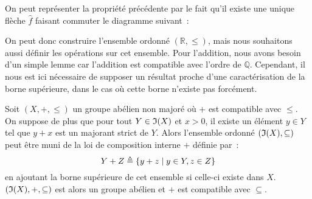 \begin{remark}
  On peut représenter la propriété précédente par le fait qu'il existe une
  unique flèche $\hat f$ faisant commuter le diagramme suivant~:
  \begin{center}
  \end{center}
\end{remark}

On peut donc construire l'ensemble ordonné $(\mathbb R,\leq)$, mais nous
souhaitons aussi définir les opérations sur cet ensemble. Pour l'addition, nous
avons besoin d'un simple lemme car l'addition est compatible avec l'ordre de
$\mathbb Q$. Cependant, il nous est ici nécessaire de supposer un résultat
proche d'une caractérisation de la borne supérieure, dans le cas où cette borne
n'existe pas forcément.

\begin{lemma}\label{lem.R.compat}
  Soit $(X,+,\leq)$ un groupe abélien non majoré où $+$ est compatible avec
  $\leq$. On suppose de plus que pour tout $Y \in \mathfrak{I}(X)$ et $x > 0$, il
  existe un élément $y \in Y$ tel que $y + x$ est un majorant strict de $Y$.
  Alors l'ensemble ordonné $(\mathfrak{I}(X),\subseteq)$ peut être muni de la loi de
  composition interne $+$ définie par~:
  \[Y + Z \triangleq \{y + z \mid y \in Y, z \in Z\}\]
  en ajoutant la borne supérieure de cet ensemble si celle-ci existe dans $X$.
  $(\mathfrak{I}(X),+,\subseteq)$ est alors un groupe abélien et $+$ est compatible
  avec $\subseteq$.
\end{lemma}


